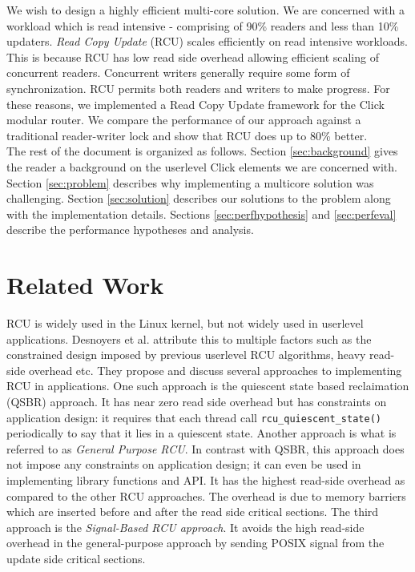 \documentclass[12pt,a4paper]{article}
\begin{document}
We wish to design a highly efficient multi-core solution. We are concerned with a workload which is read intensive - comprising of 90\% readers and less than 10\% updaters. \emph{Read Copy Update} (RCU)\cite{readcopyupdate} scales efficiently on read intensive workloads. This is because RCU has low read side overhead allowing efficient scaling of concurrent readers. Concurrent writers generally require some form of synchronization. RCU permits both readers and writers to make progress. For these reasons, we implemented a Read Copy Update framework for the Click modular router. We compare the performance of our approach against a traditional reader-writer lock and show that RCU does up to 80\% better.\\

The rest of the document is organized as follows. Section \ref{sec:background} gives the reader a background on the userlevel Click elements we are concerned with. Section \ref{sec:problem} describes why implementing a multicore solution was challenging. Section \ref{sec:solution} describes our solutions to the problem along with the implementation details. Sections \ref{sec:perfhypothesis} and \ref{sec:perfeval} describe the performance hypotheses and analysis.
\section{Related Work}
RCU is widely used in the Linux kernel, but not widely used in userlevel applications. Desnoyers et al. \cite{urcu} attribute this to multiple factors such as the constrained design imposed by previous userlevel RCU algorithms, heavy read-side overhead etc. They propose and discuss several approaches to implementing RCU in applications. One such approach is the quiescent state based reclaimation (QSBR)  approach. It has near zero read side overhead but has constraints on application design: it requires that each thread call \verb+rcu_quiescent_state()+ periodically to say that it lies in a quiescent state. Another approach is what is referred to as \emph{General Purpose RCU}. In contrast with QSBR, this approach does not impose any constraints on application design; it can even be used in implementing library functions and API. It has the highest read-side overhead as compared to the other RCU approaches. The overhead is due to memory barriers which are inserted before and after the read side critical sections. The third approach is the \emph{Signal-Based RCU approach}. It avoids the high read-side overhead in the general-purpose approach by sending POSIX signal from the update side critical sections.
\end{document}
